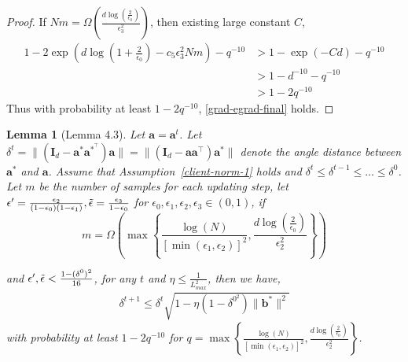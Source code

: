 \documentclass{article}
\theoremstyle{plain}
\newtheorem{lemma}[theorem]{Lemma}
\theoremstyle{definition}
\theoremstyle{remark}
\begin{document}
\begin{proof}
If $Nm=\Omega(\frac{d\log(\frac{2}{\epsilon_0})}{\epsilon_3^2})$, then existing large constant $C$, 
\begin{align}
1-2 \exp{(d\log(1+\frac{2}{\epsilon_0})-c_5\epsilon_3^2Nm)}-q^{-10}&>1-\exp(-Cd)-q^{-10} \\ 
&> 1-d^{-10}-q^{-10}\\
&>1-2q^{-10}
\end{align}Thus with probability at least $1-2q^{-10}$, \eqref{grad-egrad-final} holds.
\end{proof}

\begin{lemma}[Lemma 4.3] \label{lem:lemma-43-appendix}
    Let $\mathbf{a} = \mathbf{a}^t$. Let $\delta^t = \lVert (\mathbf{I}_d-\mathbf{a}^*\mathbf{a}^{*^\top})\mathbf{a}\rVert = \lVert (\mathbf{I}_d-\mathbf{a}\mathbf{a}^\top)\mathbf{a}^*\rVert$ denote the angle distance between $\mathbf{a}^{*}$ and $\mathbf{a}$. Assume that Assumption~\ref{client-norm-1} holds and $\delta^t \leq \delta^{t-1} \leq \dots \leq \delta^0$. Let $m$ be the number of samples for each updating step, let $\epsilon'=\frac{\epsilon_2}{(1-\epsilon_0)(1-\epsilon_1)},\Tilde{\epsilon}=\frac{\epsilon_3}{1-\epsilon_0}$ for $\epsilon_0, \epsilon_1, \epsilon_2, \epsilon_3 \in (0,1)$, if
    \[
    m= \Omega\left(\max\left\{\frac{\log(N)}{[\min(\epsilon_1,\epsilon_2)]^2},\frac{d\log(\frac{2}{\epsilon_0})}{\epsilon_2^2}\right\}\right)
    \]
    
    
    and $\epsilon',\Tilde{\epsilon}<\frac{1-(\delta^0)^2}{16}$, for any $t$ and $\eta \leq \frac{1}{L_{max}^2}$, then we have,
    \begin{align}
        \delta^{t+1} \leq \delta^{t} \sqrt{1-\eta (1-\delta^{0^2})\|\mathbf b^*\|^2} 
    \end{align}
    with probability at least $1-2q^{-10}$ for $q = \max\left\{\frac{\log(N)}{[\min(\epsilon_1,\epsilon_2)]^2},\frac{d\log(\frac{2}{\epsilon_0})}{\epsilon_2^2}\right\}$.
\end{lemma}
\end{document}
